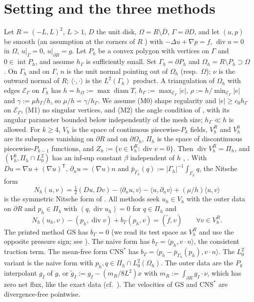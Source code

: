\documentclass[5p,times]{elsarticle}
\theoremstyle{definition}
\newcommand{\hG}{h_\Gamma}
\newcommand{\hO}{h_\Omega}
\newcommand{\Gh}{\Gamma_h}
\newcommand{\Oh}{\Omega_h}
\newcommand{\EG}{\mathcal E_\Gamma}
\newcommand{\Vh}{V_h}
\newcommand{\VR}{V_h^R}
\newcommand{\VO}{V_h^0}
\newcommand{\Pih}{\Pi_h}
\newcommand{\Zh}{Z_h}
\newcommand{\gI}{g_I}
\newcommand{\dn}{\partial_n}
\newcommand{\ft}{\tilde f}
\newcommand{\pbG}{\bar p_{\Gamma_h}}
\newcommand{\ip}[2]{\langle #1,#2\rangle}
\newcommand{\GS}{\mathrm{GS}}
\newcommand{\CNS}{\mathrm{CNS}^\ast}
\renewcommand{\div}{\operatorname{div}}
\newcommand{\ext}[1]{\cite[#1]{PadhiExt}}
\begin{document}
\section{Setting and the three methods}\label{sec:setting}

Let $R=(-L,L)^2$, $L>1$, $D$ the unit disk, $\Omega=R\setminus\overline D$, $\Gamma=\partial D$, and let $(u,p)$ be smooth (an assumption at the corners of $R$ \ext{Rem.~2.5}) with $-\Delta u+\nabla p=f$, $\div u=0$ in $\Omega$, $u|_\Gamma=0$, $u|_{\partial R}=g$. Let $P_h$ be a convex polygon with vertices on $\Gamma$ and $0\in\operatorname{int}P_h$, and assume $\hG$ is sufficiently small. Set $\Gh=\partial P_h$ and $\Oh=R\setminus P_h\supset\Omega$. On $\Gh$ and on $\Gamma$, $n$ is the unit normal pointing out of $\Oh$ (resp.\ $\Omega$); $\nu$ is the outward normal of $R$; $\ip\cdot\cdot$ is the $L^2(\Gh)$ product. A triangulation of $\Oh$ with edges $\EG$ on $\Gh$ has
$h=\hO:=\max\operatorname{diam}T$, $\hG:=\max_{\EG}|e|$, $\rho:=h/\min_{\EG}|e|$ and $\gamma:=\mu\hG/h$, so $\mu/h=\gamma/\hG$.
We assume (M0) shape regularity and $|e|\ge c_0\hG$ on $\EG$, (M1) no singular vertices, and (M2) the angle condition of \cite[Thm.~1]{GuzmanScott2019}, with its angular parameter bounded below independently of the mesh size; $\hG\ll h$ is allowed. For $k\ge4$, $\Vh$ is the space of continuous piecewise-$P_k$ fields, $\VR$ and $\VO$ are its subspaces vanishing on $\partial R$ and on $\partial\Oh$, $\Pih$ is the space of discontinuous piecewise-$P_{k-1}$ functions, and $\Zh:=\{v\in\VR:\div v=0\}$. Then $\div\VR=\Pih$, and $(\VO,\Pih\cap L^2_0)$ has an inf-sup constant $\beta$ independent of $h$ \cite{GuzmanScott2019}, \ext{Lemmas~4.3, 4.5}. With $Du=\nabla u+(\nabla u)^{\mathsf T}$, $\dn u=(\nabla u)n$ and $\pbG(q):=|\Gh|^{-1}\int_{\Gh}q$, the Nitsche form
\[
N_h(u,v)=\tfrac12(Du,Dv)-\ip{\dn u}{v}-\ip{u}{\dn v}+(\mu/h)\ip uv
\]
is the symmetric Nitsche form of \cite{GjerdeScott2024}. All methods seek $u_h\in\Vh$ with the outer data on $\partial R$ and $p_h\in\Pih$ with $(q,\div u_h)=0$ for $q\in\Pih$ and
\begin{equation}\label{eq:methods}
N_h(u_h,v)-(p_h,\div v)+b_\Gamma(p_h,v)=(\ft,v)\qquad\forall v\in\VR .
\end{equation}
The printed method $\GS$ \cite[(28)]{GjerdeScott2024} has $b_\Gamma=0$ (we read its test space as $\VR$ and use the opposite pressure sign; see \ext{\S2}). The naive form has $b_\Gamma=\ip{p_h}{v\cdot n}$, the consistent traction term. The mean-free form $\CNS$ has $b_\Gamma=\ip{p_h-\pbG(p_h)}{v\cdot n}$. The $L^2_0$ variant is the naive form with $p_h,q\in\Pih\cap L^2_0(\Oh)$. The outer data are the $P_k$ interpolant $\gI$ of $g$, or $\tilde g_I:=\gI-(m_R/8L^2)x$ with $m_R:=\int_{\partial R}\gI\cdot\nu$, which has zero net flux, like the exact data (cf.\ \cite{EickmannScottTscherpel2025}). The velocities of $\GS$ and $\CNS$ are divergence-free pointwise.
\end{document}
